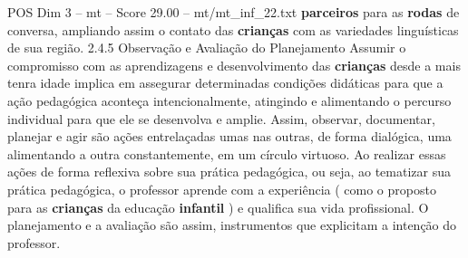 \begin{textsample}{POS Dim 3 – mt – Score 29.00 – mt/mt\_inf\_22.txt}
\textbf{parceiros} para as \textbf{rodas} de conversa, ampliando assim o contato das \textbf{crianças} com as variedades linguísticas de sua região. 2.4.5 Observação e Avaliação do Planejamento Assumir o compromisso com as aprendizagens e desenvolvimento das \textbf{crianças} desde a mais tenra idade implica em assegurar determinadas condições didáticas para que a ação pedagógica aconteça intencionalmente, atingindo e alimentando o percurso individual para que ele se desenvolva e amplie.
Assim, observar, documentar, planejar e agir são ações entrelaçadas umas nas outras, de forma dialógica, uma alimentando a outra constantemente, em um círculo virtuoso.
Ao realizar essas ações de forma reflexiva sobre sua prática pedagógica, ou seja, ao tematizar sua prática pedagógica, o professor aprende com a experiência ( como o proposto para as \textbf{crianças} da educação \textbf{infantil} ) e qualifica sua vida profissional.
O planejamento e a avaliação são assim, instrumentos que explicitam a intenção do professor.

\end{textsample}
